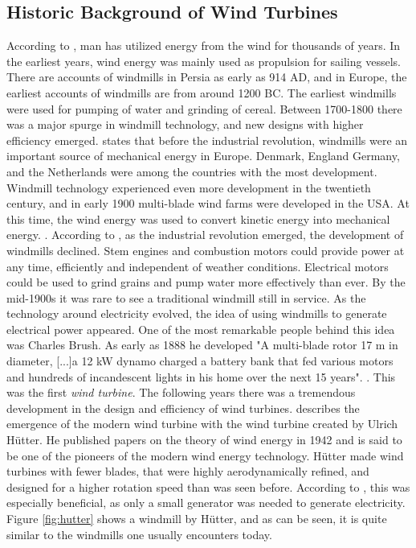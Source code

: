 \subsection{Historic Background of Wind Turbines}
According to \cite{Wagner2013}, man has utilized energy from the wind for thousands of years. In the earliest years, wind energy was mainly used as propulsion for sailing vessels. There are accounts of windmills in Persia as early as 914 AD, and in Europe, the earliest accounts of windmills are from around 1200 BC. The earliest windmills were used for pumping of water and grinding of cereal. Between 1700-1800 there was a major spurge in windmill technology, and new designs with higher efficiency emerged. \cite{Lynn2011} states that before the industrial revolution, windmills were an important source of mechanical energy in Europe. Denmark, England Germany, and the Netherlands were among the countries with the most development. Windmill technology experienced even more development in the twentieth century, and in early 1900 multi-blade wind farms were developed in the USA. At this time, the wind energy was used to convert kinetic energy into mechanical energy. \cite{Hau2013}. According to \cite{Lynn2011}, as the industrial revolution emerged, the development of windmills declined. Stem engines and combustion motors could provide power at any time, efficiently and independent of weather conditions. Electrical motors could be used to grind grains and pump water more effectively than ever. By the mid-1900s it was rare to see a traditional windmill still in service. \newline 
\newline
As the technology around electricity evolved, the idea of using windmills to generate electrical power appeared. One of the most remarkable people behind this idea was Charles Brush. As early as 1888 he developed "A multi-blade rotor 17 m in diameter, [...]a 12 kW dynamo charged a battery bank that fed various motors and hundreds of incandescent lights in his home over the next 15 years". \cite{Lynn2011}. This was the first \textit{wind turbine}. The following years there was a tremendous development in the design and efficiency of wind turbines. \cite{Hau2013} describes the emergence of the modern wind turbine with the wind turbine created by Ulrich Hütter. He published papers on the theory of wind energy in 1942 and is said to be one of the pioneers of the modern wind energy technology. Hütter made wind turbines with fewer blades, that were highly aerodynamically refined, and designed for a higher rotation speed than was seen before. According to \cite{Wagner2013}, this was especially beneficial, as only a small generator was needed to generate electricity. Figure \ref{fig:hutter} shows a windmill by Hütter, and as can be seen, it is quite similar to the windmills one usually encounters today. \newline
\newline

